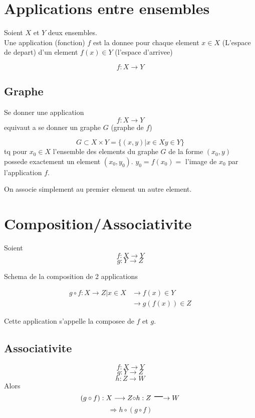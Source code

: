 \documentclass[../main.tex]{subfiles}
\begin{document}
\section{Applications entre ensembles}
	
Soient $X$ et $Y$ deux ensembles.\\

Une application (fonction) $f$ est la donnee pour chaque element $x \in X$ (L'espace de depart) d'un element $f(x) \in Y$ (l'espace d'arrivee)

\[ 
f: X \rightarrow Y
\]
\subsection{Graphe}
Se donner une application
\[ 
	f: X \rightarrow Y
\]
equivaut a se donner un graphe $G$ (graphe de $f$)

\[ 
	G \subset X \times Y = \{(x,y) \vert x \in X y \in Y\}
\]
tq pour $x_0 \in X$ l'ensemble des elements du graphe $G$ de la forme $(x_0,y)$ possede exactement un element $(x_0,y_0)$.
$y_0= f(x_0)=$ l'image de $x_0$ par l'application $f$.

On associe simplement au premier element un autre element.




\section{Composition/Associativite}
Soient
\[ 
f: X \rightarrow Y
\]
\[ 
g: Y \rightarrow Z
\]

\begin{marginfigure}
    \caption{Schema de la composition de 2 applications}
    \label{fig:schemacomposition}
\end{marginfigure}
\begin{align*}
	g \circ f : X \longrightarrow Z \vert x \in X &\longrightarrow f(x) \in Y\\
						      &\longrightarrow g(f(x)) \in Z
\end{align*}

Cette application s'appelle la composee de $f$ et $g$.

\subsection{Associativite}
\[ 
f:X \longrightarrow Y
\]
\[ 
g:Y \longrightarrow Z
\]
\[ 
h:Z \longrightarrow W
\]
Alors
\[ 
	( g \circ f): X \longrightarrow Z \huge{ \circ } h: Z \longrightarrow W
\]
\[ 
	\Rightarrow h \circ ( g \circ f)
\]
\end{document}
